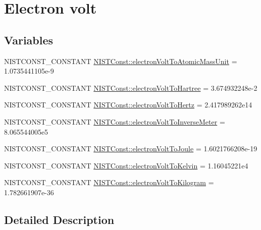 \hypertarget{group___n_i_s_t_const-_electron_volt}{}\section{Electron volt}
\label{group___n_i_s_t_const-_electron_volt}
\subsection*{Variables}
\begin{DoxyCompactItemize}
\item 
N\+I\+S\+T\+C\+O\+N\+S\+T\+\_\+\+C\+O\+N\+S\+T\+A\+NT \mbox{\hyperlink{group___n_i_s_t_const-_electron_volt_ga62eaf49fce099edf5f51c125dc4dd927}{N\+I\+S\+T\+Const\+::electron\+Volt\+To\+Atomic\+Mass\+Unit}} = 1.\+0735441105e-\/9
\item 
N\+I\+S\+T\+C\+O\+N\+S\+T\+\_\+\+C\+O\+N\+S\+T\+A\+NT \mbox{\hyperlink{group___n_i_s_t_const-_electron_volt_ga31b4d719efdddf0a302918557df2ea95}{N\+I\+S\+T\+Const\+::electron\+Volt\+To\+Hartree}} = 3.\+674932248e-\/2
\item 
N\+I\+S\+T\+C\+O\+N\+S\+T\+\_\+\+C\+O\+N\+S\+T\+A\+NT \mbox{\hyperlink{group___n_i_s_t_const-_electron_volt_gae9b1b225f20da4725294b95a05ea82e0}{N\+I\+S\+T\+Const\+::electron\+Volt\+To\+Hertz}} = 2.\+417989262e14
\item 
N\+I\+S\+T\+C\+O\+N\+S\+T\+\_\+\+C\+O\+N\+S\+T\+A\+NT \mbox{\hyperlink{group___n_i_s_t_const-_electron_volt_ga333e07ed95192173791fcf53673f79ef}{N\+I\+S\+T\+Const\+::electron\+Volt\+To\+Inverse\+Meter}} = 8.\+065544005e5
\item 
N\+I\+S\+T\+C\+O\+N\+S\+T\+\_\+\+C\+O\+N\+S\+T\+A\+NT \mbox{\hyperlink{group___n_i_s_t_const-_electron_volt_ga214ec0b05df4113393bd1d3e631aebe6}{N\+I\+S\+T\+Const\+::electron\+Volt\+To\+Joule}} = 1.\+6021766208e-\/19
\item 
N\+I\+S\+T\+C\+O\+N\+S\+T\+\_\+\+C\+O\+N\+S\+T\+A\+NT \mbox{\hyperlink{group___n_i_s_t_const-_electron_volt_gaaac3cf941012add952f4aee0c72f0a42}{N\+I\+S\+T\+Const\+::electron\+Volt\+To\+Kelvin}} = 1.\+16045221e4
\item 
N\+I\+S\+T\+C\+O\+N\+S\+T\+\_\+\+C\+O\+N\+S\+T\+A\+NT \mbox{\hyperlink{group___n_i_s_t_const-_electron_volt_gac875b0f36fd52d70256d4a3d86eebb2e}{N\+I\+S\+T\+Const\+::electron\+Volt\+To\+Kilogram}} = 1.\+782661907e-\/36
\end{DoxyCompactItemize}


\subsection{Detailed Description}


